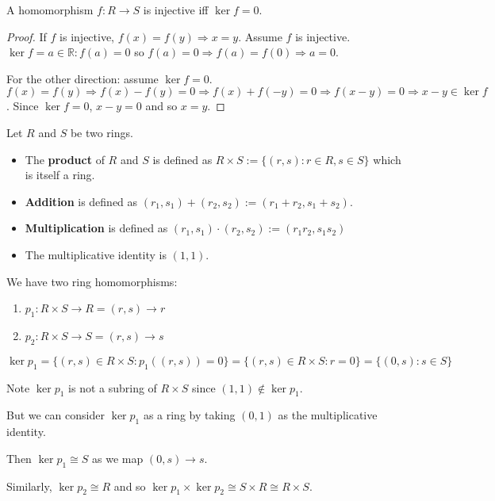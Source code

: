 \begin{lemma}
	A homomorphism $f: R \rightarrow S$ is injective iff $\ker f = {0}$.
\end{lemma}

\begin{proof}
	If $f$ is injective, $f(x) = f(y) \Rightarrow x = y$. Assume $f$ is injective. $\ker f = {a \in \mathbb{R}: f(a) = 0}$ so $f(a) = 0 \Rightarrow f(a) = f(0) \Rightarrow a = 0$.

	For the other direction: assume $\ker f = {0}$. $f(x) = f(y) \Rightarrow f(x) - f(y) = 0 \Rightarrow f(x) + f(-y) = 0 \Rightarrow f(x - y) = 0 \Rightarrow x - y \in \ker f$. Since $\ker f = {0}$, $x - y = 0$ and so $x = y$.
\end{proof}

\begin{definition}
	Let $R$ and $S$ be two rings.
	\begin{itemize}
		\item The \textbf{product} of $R$ and $S$ is defined as $R \times S := \{(r, s): r \in R, s \in S\}$ which is itself a ring.
		\item \textbf{Addition} is defined as $(r_1, s_1) + (r_2, s_2) := (r_1 + r_2, s_1 + s_2)$.
		\item \textbf{Multiplication} is defined as $(r_1, s_1) \cdot (r_2, s_2) := (r_1 r_2, s_1 s_2)$
		\item The multiplicative identity is $(1, 1)$.
	\end{itemize}
\end{definition}

\begin{definition}
	We have two ring homomorphisms:
	\begin{enumerate}
		\item $p_1: R \times S \rightarrow R = (r, s) \rightarrow r$
		\item $p_2: R \times S \rightarrow S = (r, s) \rightarrow s$
	\end{enumerate}

	$\ker p_1 = \{(r, s) \in R \times S: p_1((r, s)) = 0\} = \{(r, s) \in R \times S: r = 0\} = \{(0, s): s \in S\}$
\end{definition}

\begin{remark}
	Note $\ker p_1$ is not a subring of $R \times S$ since $(1, 1) \notin \ker p_1$.

	But we can consider $\ker p_1$ as a ring by taking $(0, 1)$ as the multiplicative identity.

	Then $\ker p_1 \cong S$ as we map $(0, s) \rightarrow s$.

	Similarly, $\ker p_2 \cong R$ and so $\ker p_1 \times \ker p_2 \cong S \times R \cong R \times S$.
\end{remark}

